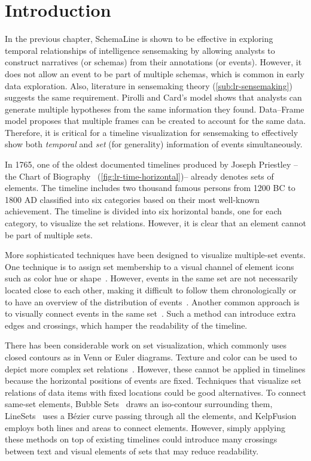 \section{Introduction}
In the previous chapter, SchemaLine is shown to be effective in exploring temporal relationships of intelligence sensemaking by allowing analysts to construct narratives (or schemas) from their annotations (or events). However, it does not allow an event to be part of multiple schemas, which is common in early data exploration. Also, literature in sensemaking theory (\autoref{sub:lr-sensemaking})  suggests the same requirement. Pirolli and Card's model shows that analysts can generate multiple hypotheses from the same information they found. Data--Frame model proposes that multiple frames can be created to account for the same data. Therefore, it is critical for a timeline visualization for sensemaking to effectively show both \emph{temporal} and \emph{set} (for generality) information of events simultaneously.

In 1765, one of the oldest documented timelines produced by Joseph Priestley -- the Chart of Biography~\cite{Priestley1765} (\autoref{fig:lr-time-horizontal})-- already denotes sets of elements. The timeline includes two thousand famous persons from 1200 BC to 1800 AD classified into six categories based on their most well-known achievement. The timeline is divided into six horizontal bands, one for each category, to visualize the set relations. However, it is clear that an element cannot be part of multiple sets.

More sophisticated techniques have been designed to visualize multiple-set events. One technique is to assign set membership to a visual channel of element icons such as color hue or shape~\cite{TimeGlider2016}. However, events in the same set are not necessarily located close to each other, making it difficult to follow them chronologically or to have an overview of the distribution of events~\cite{SimileTimeline2009,TimeGlider2016}. Another common approach is to visually connect events in the same set~\cite{Kumar1998}. Such a method can introduce extra edges and crossings, which hamper the readability of the timeline.

There has been considerable work on set visualization, which commonly uses closed contours as in Venn or Euler diagrams. Texture and color can be used to depict more complex set relations~\cite{Ware2013}. However, these cannot be applied in timelines because the horizontal positions of events are fixed. Techniques that visualize set relations of data items with fixed locations could be good alternatives. To connect same-set elements, Bubble Sets~\cite{Collins2009a} draws an iso-contour surrounding them, LineSets~\cite{Alper2011} uses a B\'{e}zier curve passing through all the elements, and KelpFusion~\cite{Meulemans2013} employs both lines and areas to connect elements. However, simply applying these methods on top of existing timelines could introduce many crossings between text and visual elements of sets that may reduce readability.

